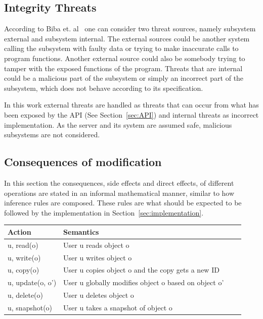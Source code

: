 \documentclass[a4paper,12pt]{article}
\begin{document}
\subsection{Integrity Threats}
According to Biba et. al~\cite{BIBA} one can consider two threat sources, namely subsystem external
and subsystem internal. The external sources could be another system calling the subsystem with
faulty data or trying to make inaccurate calls to program functions. Another external source could
also be somebody trying to tamper with the exposed functions of the program. Threats that are
internal could be a malicious part of the subsystem or simply an incorrect part of the subsystem,
which does not behave according to its specification.

In this work external threats are handled as threats that can occur from what has been exposed by
the API (See Section~\ref{sec:API}) and internal threats as incorrect implementation. As the server
and its system are assumed safe, malicious subsystems are not considered.

\subsection{Consequences of modification} \label{sec:conseq}

In this section the consequences, side effects and direct effects, of different operations are
stated in an informal mathematical manner, similar to how inference rules are composed. These rules
are what should be expected to be followed by the implementation in
Section~\ref{sec:implementation}. 

\begin{center}
    \begin{tabular}{ | l | l | l | p{5cm} |}
        \hline
        \textbf{Action} & \textbf{Semantics} \\ \hline
        u, read(o)            & User u reads object o\\ \hline
        u, write(o)           & User u writes object o\\ \hline
        u, copy(o)            & User u copies object o and the copy gets a new ID\\ \hline
        u, update(o, o')      & User u globally modifies object o based on object o'\\ \hline
        u, delete(o)          & User u deletes object o\\ \hline
        u, snapshot(o)        & User u takes a snapshot of object o \\ \hline
    \end{tabular}
\end{center}
\end{document}
